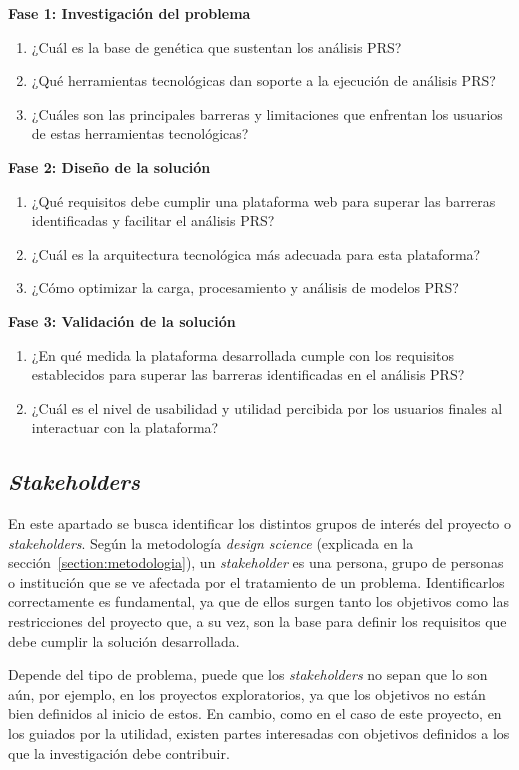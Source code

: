 \textbf{Fase 1: Investigación del problema}
\begin{enumerate}
    \item ¿Cuál es la base de genética que sustentan los análisis PRS? 
    \item ¿Qué herramientas tecnológicas dan soporte a la ejecución de análisis PRS? 
    \item ¿Cuáles son las principales barreras y limitaciones que enfrentan los usuarios de estas herramientas tecnológicas? 
\end{enumerate}

\textbf{Fase 2: Diseño de la solución}
\begin{enumerate}
    \item ¿Qué requisitos debe cumplir una plataforma web para superar las barreras identificadas y facilitar el análisis PRS? 
    \item ¿Cuál es la arquitectura tecnológica más adecuada para esta plataforma? 
    \item ¿Cómo optimizar la carga, procesamiento y análisis de modelos PRS?     
\end{enumerate}

\textbf{Fase 3: Validación de la solución}
\begin{enumerate}
    \item ¿En qué medida la plataforma desarrollada cumple con los requisitos establecidos para superar las barreras identificadas en el análisis PRS?
    \item ¿Cuál es el nivel de usabilidad y utilidad percibida por los usuarios finales al interactuar con la plataforma?
\end{enumerate}

\subsection{\textit{Stakeholders}}
En este apartado se busca identificar los distintos grupos de interés del proyecto o \textit{stakeholders}. Según la metodología \textit{design science} (explicada en la sección~\ref{section:metodologia}), un \textit{stakeholder} es una persona, grupo de personas o institución que se ve afectada por el tratamiento de un problema. Identificarlos correctamente es fundamental, ya que de ellos surgen tanto los objetivos como las restricciones del proyecto que, a su vez, son la base para definir los requisitos que debe cumplir la solución desarrollada. 

Depende del tipo de problema, puede que los \textit{stakeholders} no sepan que lo son aún, por ejemplo, en los proyectos exploratorios, ya que los objetivos no están bien definidos al inicio de estos. En cambio, como en el caso de este proyecto, en los guiados por la utilidad, existen partes interesadas con objetivos definidos a los que la investigación debe contribuir. 

